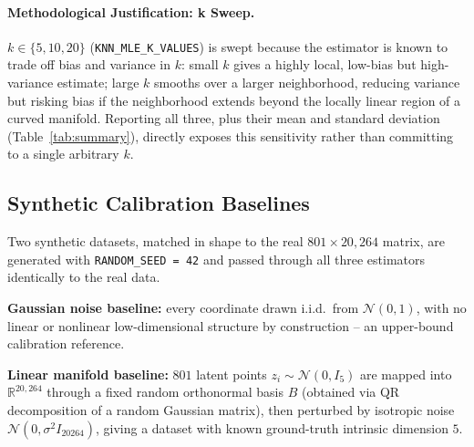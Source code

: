 \documentclass[11pt]{article}
\begin{document}
\paragraph{Methodological Justification: k Sweep.}
$k \in \{5, 10, 20\}$ (\texttt{KNN\_MLE\_K\_VALUES}) is swept because the
estimator is known to trade off bias and variance in $k$: small $k$ gives
a highly local, low-bias but high-variance estimate; large $k$ smooths
over a larger neighborhood, reducing variance but risking bias if the
neighborhood extends beyond the locally linear region of a curved
manifold. Reporting all three, plus their mean and standard deviation
(Table~\ref{tab:summary}), directly exposes this sensitivity rather than
committing to a single arbitrary $k$.

\subsection{Synthetic Calibration Baselines}

Two synthetic datasets, matched in shape to the real
$801 \times 20{,}264$ matrix, are generated with \texttt{RANDOM\_SEED = 42}
and passed through all three estimators identically to the real data.

\textbf{Gaussian noise baseline:} every coordinate drawn i.i.d.\ from
$\mathcal{N}(0, 1)$, with no linear or nonlinear low-dimensional structure
by construction -- an upper-bound calibration reference.

\textbf{Linear manifold baseline:} $801$ latent points
$z_i \sim \mathcal{N}(0, I_5)$ are mapped into $\mathbb{R}^{20{,}264}$
through a fixed random orthonormal basis $B$ (obtained via QR
decomposition of a random Gaussian matrix), then perturbed by isotropic
noise $\mathcal{N}(0, \sigma^2 I_{20264})$, giving a dataset with known
ground-truth intrinsic dimension $5$.
\end{document}
